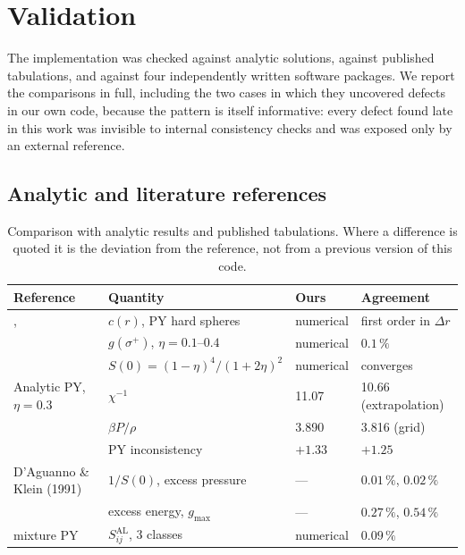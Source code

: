 
\section{Validation}
\label{sec:validation}

The implementation was checked against analytic solutions, against published
tabulations, and against four independently written software packages. We
report the comparisons in full, including the two cases in which they
uncovered defects in our own code, because the pattern is itself informative:
every defect found late in this work was invisible to internal consistency
checks and was exposed only by an external reference.

\subsection{Analytic and literature references}

\begin{table}[htbp]
\centering
\caption{Comparison with analytic results and published tabulations. Where a
difference is quoted it is the deviation from the reference, not from a
previous version of this code.}
\label{tab:analytic}
\small
\begin{tabular}{llll}
\toprule
Reference & Quantity & Ours & Agreement\\
\midrule
\citet{Wertheim1963}, \citet{Thiele1963} & $c(r)$, PY hard spheres & numerical & first order in $\Delta r$\\
                               & $g(\sigma^+)$, $\eta=0.1$--$0.4$ & numerical & $0.1\,\%$\\
                               & $S(0)=(1-\eta)^4/(1+2\eta)^2$ & numerical & converges\\
Analytic PY, $\eta=0.3$        & $\chi^{-1}$ & 11.07 & 10.66 (extrapolation)\\
                               & $\beta P/\rho$ & 3.890 & 3.816 (grid)\\
                               & PY inconsistency & $+1.33$ & $+1.25$\\
D'Aguanno \& Klein (1991)      & $1/S(0)$, excess pressure & --- & $0.01\,\%$, $0.02\,\%$\\
                               & excess energy, $g_{\max}$ & --- & $0.27\,\%$, $0.54\,\%$\\
\citet{Vrij1979} mixture PY         & $S^{\mathrm{AL}}_{ij}$, 3 classes & numerical & $0.09\,\%$\\
\bottomrule
\end{tabular}
\end{table}

